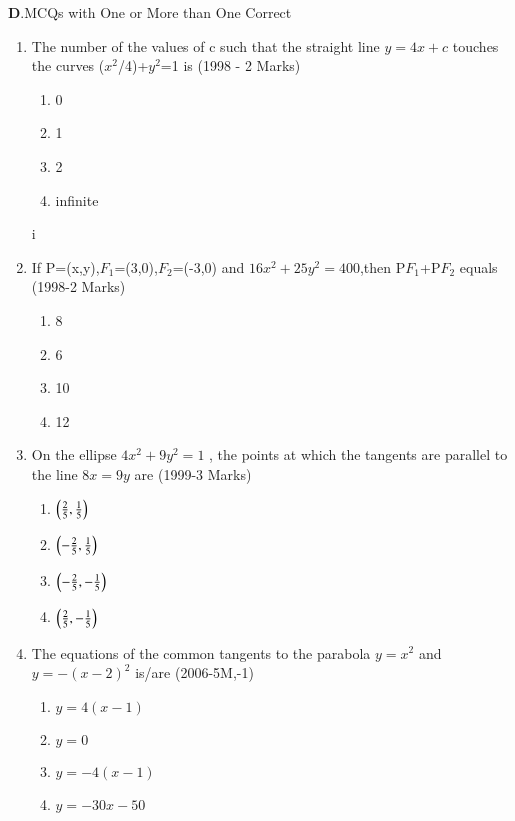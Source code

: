 \documentclass[journal,12pt,onecolumn]{IEEEtran}
\theoremstyle{remark}
\begin{document}
		\textbf{D}.MCQs with One or More than One Correct
		\vspace{0.5cm}
\begin{enumerate}
\item The number of the values of c such that the straight line $y=4x+c$ touches the curves ($x^2$/4)+$y^2$=1 is \hfill(1998 - 2 Marks)\\
	\begin{enumerate}
	\item 0
	\item 1
	\item 2
	\item infinite
	\end{enumerate}i

\item If P=(x,y),$F_{1}$=(3,0),$F_{2}$=(-3,0) and $16x^2+25y^2=400$,then P$F_{1}$+P$F_{2}$ equals \hfill(1998-2 Marks)\\
	\begin{enumerate}
		\item 8
		\item 6
		\item 10
		\item 12
	\end{enumerate}

\item On the ellipse $4x^2+9y^2=1$ , the points at which the tangents are parallel to the line $8x=9y$ are \hfill(1999-3 Marks)\\
	\begin{enumerate}
		\item $\left(\frac{2}{5},\frac{1}{5}\right)$
		\item $\left(-\frac{2}{5},\frac{1}{5}\right)$
		\item $\left(-\frac{2}{5},-\frac{1}{5}\right)$
		\item $\left(\frac{2}{5},-\frac{1}{5}\right)$
	\end{enumerate}

\item The equations of the common tangents to the parabola $y=x^2$ and $y=-(x-2)^2$ is/are \hfill(2006-5M,-1)\\
	\begin{enumerate}
		\item $y=4(x-1)$
		\item $y=0$
		\item $y=-4(x-1)$
		\item $y=-30x-50$
	\end{enumerate}


\end{enumerate}
\end{document}

